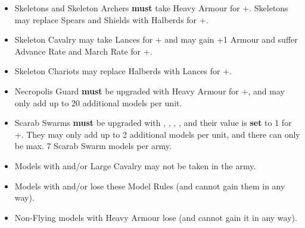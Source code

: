 \begin{itemize}
\item Skeletons and Skeleton Archers \textbf{must} take Heavy Armour for +\permodel{}. Skeletons may replace Spears and Shields with Halberds for +\permodel{}.

\item Skeleton Cavalry may take Lances for +\permodel{} and may gain +1 Armour and suffer \minuss{} Advance Rate and \minuss{} March Rate for +\permodel{}.

\item \rnf{} Skeleton Chariots may replace Halberds with Lances for +\permodel{}.

\item Necropolis Guard \textbf{must} be upgraded with Heavy Armour for +\permodel{}, and may only add up to 20 additional models per unit.

\item Scarab Swarms \textbf{must} be upgraded with \textbf{}, \textbf{}, \textbf{\ghoststep}, \textbf{\magicalattacks}, and their \resurrected{} value is \textbf{set} to 1 for +\permodel{}. They may only add up to 2 additional models per unit, and there can only be max. 7 Scarab Swarm models per army.

\item Models with \toweringpresence{} and/or Large Cavalry may not be taken in the army.

\item Models with \undergroundambush{} and/or \scout{} lose these Model Rules (and cannot gain them in any way).

\item Non-Flying models with Heavy Armour lose \lighttroops{} (and cannot gain it in any way).
\end{itemize}

